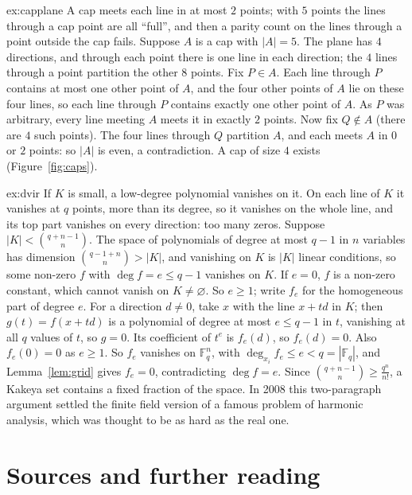 \begin{solution}{ex:capplane}
\idea A cap meets each line in at most $2$ points; with $5$ points the lines through a cap point are all ``full'', and then a parity count on the lines through a point outside the cap fails.
\writeup Suppose $A$ is a cap with $|A|=5$. The plane has $4$ directions, and through each point there is one line in each direction; the $4$ lines through a point partition the other $8$ points. Fix $P\in A$. Each line
through $P$ contains at most one other point of $A$, and the four other points of $A$ lie on these four lines, so each line through $P$ contains exactly one other point of $A$. As $P$ was arbitrary, every line
meeting $A$ meets it in exactly $2$ points. Now fix $Q\notin A$ (there are $4$ such points). The four lines through $Q$ partition $A$, and each meets $A$ in $0$ or $2$ points: so $|A|$ is even, a contradiction.
A cap of size $4$ exists (Figure~\ref{fig:caps}).
\end{solution}

\begin{solution}{ex:dvir}
\idea If $K$ is small, a low-degree polynomial vanishes on it. On each line of $K$ it vanishes at $q$ points, more than its degree, so it vanishes on the whole line, and its top part vanishes on every direction: too many zeros.
\writeup Suppose $|K|<\binom{q+n-1}n$. The space of polynomials of degree at most $q-1$ in $n$ variables has dimension $\binom{q-1+n}n>|K|$, and vanishing on $K$ is $|K|$ linear conditions, so some non-zero $f$ with
$\deg f=e\le q-1$ vanishes on $K$. If $e=0$, $f$ is a non-zero constant, which cannot vanish on $K\ne\varnothing$. So $e\ge1$; write $f_e$ for the homogeneous part of degree $e$. For a direction $d\ne0$, take $x$ with
the line $x+td$ in $K$; then $g(t)=f(x+td)$ is a polynomial of degree at most $e\le q-1$ in $t$, vanishing at all $q$ values of $t$, so $g=0$. Its coefficient of $t^e$ is $f_e(d)$, so $f_e(d)=0$. Also $f_e(0)=0$ as
$e\ge1$. So $f_e$ vanishes on $\mathbb F_q^n$, with $\deg_{x_i}f_e\le e<q=|\mathbb F_q|$, and Lemma~\ref{lem:grid} gives $f_e=0$, contradicting $\deg f=e$. Since $\binom{q+n-1}n\ge\frac{q^n}{n!}$, a Kakeya set contains a
fixed fraction of the space. In 2008 this two-paragraph argument settled the finite field version of a famous problem of harmonic analysis, which was thought to be as hard as the real one.
\end{solution}

\section*{Sources and further reading}

